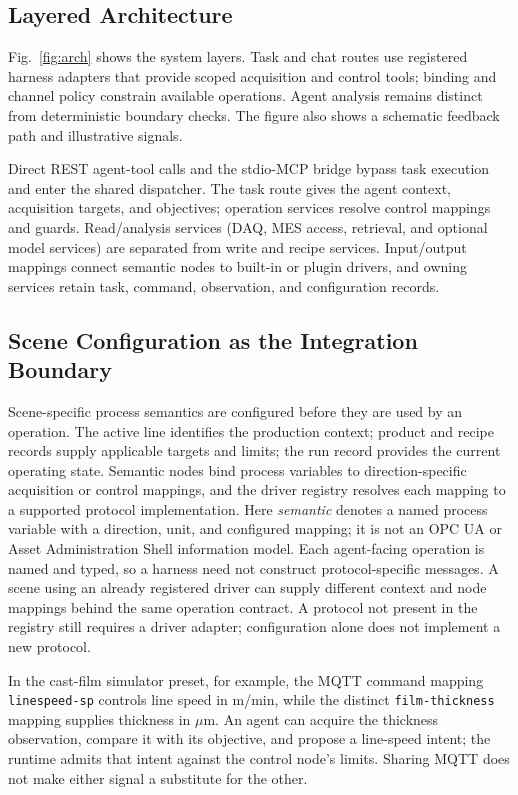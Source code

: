 \documentclass[journal]{IEEEtran}
\begin{document}
\subsection{Layered Architecture}
\label{sec:layers}
Fig.~\ref{fig:arch} shows the system layers. Task and chat routes use registered harness adapters that provide scoped acquisition and control tools; binding and channel policy constrain available operations. Agent analysis remains distinct from deterministic boundary checks. The figure also shows a schematic feedback path and illustrative signals.

Direct REST agent-tool calls and the stdio-MCP bridge bypass task execution and enter the shared dispatcher. The task route gives the agent context, acquisition targets, and objectives; operation services resolve control mappings and guards. Read/analysis services (DAQ, MES access, retrieval, and optional model services) are separated from write and recipe services. Input/output mappings connect semantic nodes to built-in or plugin drivers, and owning services retain task, command, observation, and configuration records.

\subsection{Scene Configuration as the Integration Boundary}
\label{sec:scene-config}
Scene-specific process semantics are configured before
they are used by an operation. The active line identifies the production context; product
and recipe records supply applicable targets and limits; the run record
provides the current operating state. Semantic nodes bind process variables
to direction-specific acquisition or control mappings, and the driver
registry resolves each mapping to a supported protocol implementation. Here
\emph{semantic} denotes a named process variable with a direction, unit, and
configured mapping; it is not an OPC UA or Asset Administration Shell
information model. Each agent-facing operation is named and typed, so a harness need not
construct protocol-specific messages. A scene using an already registered
driver can supply different context and node mappings behind the same
operation contract. A protocol not present in the registry still requires a
driver adapter; configuration alone does not implement a new protocol.

In the cast-film simulator preset, for example, the MQTT command mapping
\texttt{linespeed-sp} controls line speed in m/min, while the distinct
\texttt{film-thickness} mapping supplies thickness in $\mu$m. An agent can
acquire the thickness observation, compare it with its objective, and propose a
line-speed intent; the runtime admits that intent against the control node's
limits. Sharing MQTT does not make either signal a substitute for the other.
\end{document}
